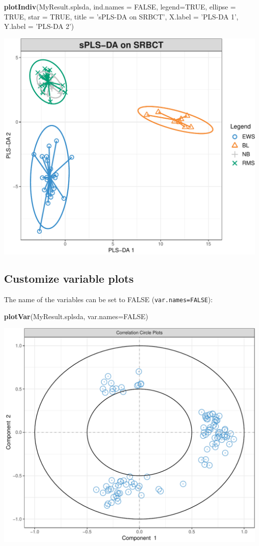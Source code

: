 \documentclass[]{book}
\newenvironment{Shaded}{\begin{snugshade}}{\end{snugshade}}
\newcommand{\DataTypeTok}[1]{\textcolor[rgb]{0.13,0.29,0.53}{#1}}
\newcommand{\KeywordTok}[1]{\textcolor[rgb]{0.13,0.29,0.53}{\textbf{#1}}}
\newcommand{\NormalTok}[1]{#1}
\newcommand{\OtherTok}[1]{\textcolor[rgb]{0.56,0.35,0.01}{#1}}
\newcommand{\StringTok}[1]{\textcolor[rgb]{0.31,0.60,0.02}{#1}}
\begin{document}
\begin{Shaded}
\begin{Highlighting}[]
\KeywordTok{plotIndiv}\NormalTok{(MyResult.splsda, }\DataTypeTok{ind.names =} \OtherTok{FALSE}\NormalTok{, }\DataTypeTok{legend=}\OtherTok{TRUE}\NormalTok{,}
          \DataTypeTok{ellipse =} \OtherTok{TRUE}\NormalTok{, }\DataTypeTok{star =} \OtherTok{TRUE}\NormalTok{, }\DataTypeTok{title =} \StringTok{'sPLS-DA on SRBCT'}\NormalTok{,}
          \DataTypeTok{X.label =} \StringTok{'PLS-DA 1'}\NormalTok{, }\DataTypeTok{Y.label =} \StringTok{'PLS-DA 2'}\NormalTok{)}
\end{Highlighting}
\end{Shaded}

\begin{center}\includegraphics[width=0.5\linewidth]{Figures/04-plsda-plotindiv-args-1} \end{center}

\hypertarget{customize-variable-plots}{%
\subsection{Customize variable plots}\label{customize-variable-plots}}

The name of the variables can be set to FALSE (\texttt{var.names=FALSE}):

\begin{Shaded}
\begin{Highlighting}[]
\KeywordTok{plotVar}\NormalTok{(MyResult.splsda, }\DataTypeTok{var.names=}\OtherTok{FALSE}\NormalTok{)}
\end{Highlighting}
\end{Shaded}

\begin{center}\includegraphics[width=0.5\linewidth]{Figures/04-plsda-plotVar-1} \end{center}
\end{document}
